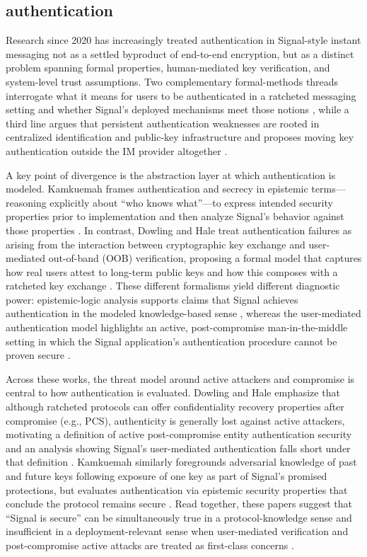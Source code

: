 \subsection{authentication}
Research since 2020 has increasingly treated authentication in Signal-style instant messaging not as a settled byproduct of end-to-end encryption, but as a distinct problem spanning formal properties, human-mediated key verification, and system-level trust assumptions. Two complementary formal-methods threads interrogate what it means for users to be authenticated in a ratcheted messaging setting and whether Signal’s deployed mechanisms meet those notions \cite{dowling2021,kamkuemah2021}, while a third line argues that persistent authentication weaknesses are rooted in centralized identification and public-key infrastructure and proposes moving key authentication outside the IM provider altogether \cite{morales2024}.

A key point of divergence is the abstraction layer at which authentication is modeled. Kamkuemah frames authentication and secrecy in epistemic terms—reasoning explicitly about ``who knows what''—to express intended security properties prior to implementation and then analyze Signal’s behavior against those properties \cite{kamkuemah2021}. In contrast, Dowling and Hale treat authentication failures as arising from the interaction between cryptographic key exchange and user-mediated out-of-band (OOB) verification, proposing a formal model that captures how real users attest to long-term public keys and how this composes with a ratcheted key exchange \cite{dowling2021}. These different formalisms yield different diagnostic power: epistemic-logic analysis supports claims that Signal achieves authentication in the modeled knowledge-based sense \cite{kamkuemah2021}, whereas the user-mediated authentication model highlights an active, post-compromise man-in-the-middle setting in which the Signal application’s authentication procedure cannot be proven secure \cite{dowling2021}.

Across these works, the threat model around active attackers and compromise is central to how authentication is evaluated. Dowling and Hale emphasize that although ratcheted protocols can offer confidentiality recovery properties after compromise (e.g., PCS), authenticity is generally lost against active attackers, motivating a definition of active post-compromise entity authentication security and an analysis showing Signal’s user-mediated authentication falls short under that definition \cite{dowling2021}. Kamkuemah similarly foregrounds adversarial knowledge of past and future keys following exposure of one key as part of Signal’s promised protections, but evaluates authentication via epistemic security properties that conclude the protocol remains secure \cite{kamkuemah2021}. Read together, these papers suggest that ``Signal is secure'' can be simultaneously true in a protocol-knowledge sense and insufficient in a deployment-relevant sense when user-mediated verification and post-compromise active attacks are treated as first-class concerns \cite{dowling2021,kamkuemah2021}.

